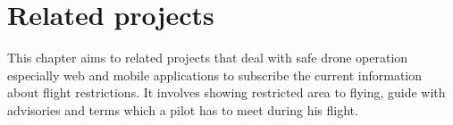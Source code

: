 \chapter{Related projects}\label{ch:related-projects}
This chapter aims to related projects that deal with safe drone operation especially web and mobile applications to subscribe the current information about flight restrictions.
It involves showing restricted area to flying, guide with advisories and terms which a pilot has to meet during his flight.














